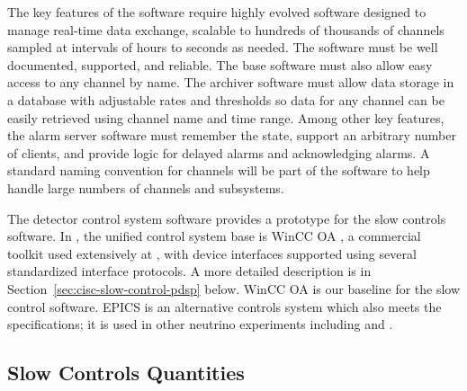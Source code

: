 The key features of the software require highly evolved software designed to manage real-time data exchange, scalable
to hundreds of thousands of channels sampled at intervals of hours to seconds as needed. The software
must be well documented, supported, and reliable. The base
software must also allow easy access to any channel by name. The
archiver software must allow data storage in a database with
adjustable rates and thresholds so data
for any channel can be easily retrieved using channel name and time range. Among other key
features, the alarm server software must remember the state, support an
arbitrary number of clients, and provide logic for delayed alarms and
acknowledging alarms. A standard naming
convention for channels will be part of the software to help handle large
numbers of channels and subsystems.



The  detector control system software \cite{pdspdcs_proc}
provides a prototype for %
the  slow controls software.
In , the unified control system base is WinCC OA \cite{winccoa}, a
commercial toolkit used extensively at , with device interfaces
supported using several standardized interface protocols. A more detailed description is in Section~\ref{sec:cisc-slow-control-pdsp} below.
WinCC OA is our baseline for the  slow control software.
EPICS \cite{epics7} is an alternative controls system which also meets the specifications; it is used in other neutrino experiments including \cite{microboone} and \cite{Lukhanin:2012fp}. 


\subsection{Slow Controls Quantities}
\label{sec:fdgen-slow-cryo-quant}



